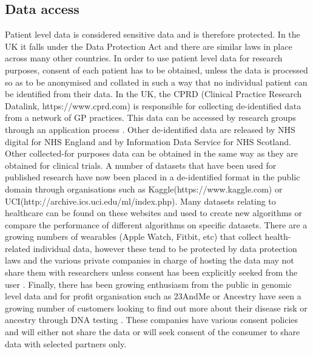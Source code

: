 \subsection{Data access}
Patient level data is considered sensitive data and is therefore protected. In the UK it falls under the Data Protection Act \citep{Government:eUQ8WqXT}  and there are similar laws in place across many other countries.\newline
In order to use patient level data for research purposes, consent of each patient has to be obtained, unless the data is processed so as to be anonymised and collated in such a way that no individual patient can be  identified from their data. In the UK, the CPRD (Clinical Practice Research Datalink, https://www.cprd.com) is responsible for collecting de-identified data from a network of GP practices. This data can be accessed by research groups through an application process \citep{CPRD:VYxcqU74}. Other de-identified data are released by NHS digital for NHS England and by Information Data Service for NHS Scotland.
Other collected-for purposes data can be obtained in the same way as they are obtained for clinical trials. A number of datasets that have been used for published research have now been placed in a de-identified format in the public domain through organisations such as Kaggle(https://www.kaggle.com) or UCI(http://archive.ics.uci.edu/ml/index.php). Many datasets relating to healthcare can be found on these websites and used to create new algorithms or compare the performance of different algorithms on specific datasets.\newline
There are a growing numbers of wearables (Apple Watch, Fitbit, etc) that collect health-related individual data, however these tend to be protected by data protection laws and the various private companies in charge of hosting the data may not share them with researchers unless consent has been explicitly seeked from the user \citep{Apple:nN4TDuuN, Fitbit:FvPrmdk3}. Finally, there has been growing enthusiasm from the public in genomic level data and for profit organisation such as 23AndMe or Ancestry have seen a growing number of customers looking to find out more about their disease risk or ancestry through DNA testing \citep{Regalado:vf}. These companies have various consent policies and will either not share the data or will seek consent of the consumer to share data with selected partners only. 


